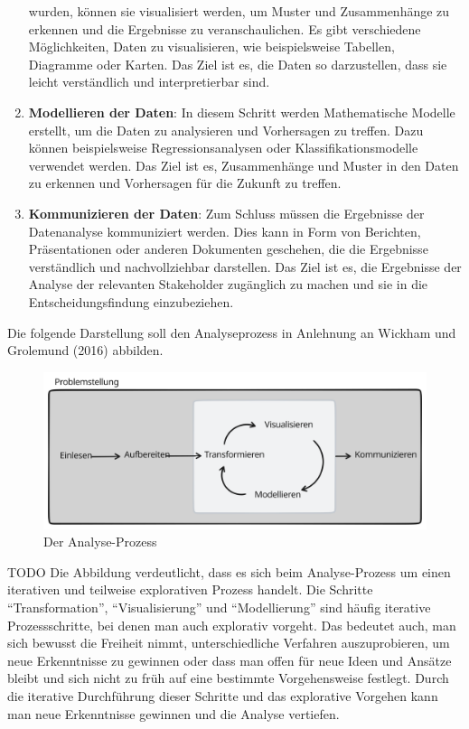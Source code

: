 \documentclass[
  letterpaper,
  DIV=11]{scrreprt}
\begin{document}
\begin{enumerate}
  wurden, können sie visualisiert werden, um Muster und Zusammenhänge zu
  erkennen und die Ergebnisse zu veranschaulichen. Es gibt verschiedene
  Möglichkeiten, Daten zu visualisieren, wie beispielsweise Tabellen,
  Diagramme oder Karten. Das Ziel ist es, die Daten so darzustellen,
  dass sie leicht verständlich und interpretierbar sind.
\item
  \textbf{Modellieren der Daten}: In diesem Schritt werden Mathematische
  Modelle erstellt, um die Daten zu analysieren und Vorhersagen zu
  treffen. Dazu können beispielsweise Regressionsanalysen oder
  Klassifikationsmodelle verwendet werden. Das Ziel ist es,
  Zusammenhänge und Muster in den Daten zu erkennen und Vorhersagen für
  die Zukunft zu treffen.
\item
  \textbf{Kommunizieren der Daten}: Zum Schluss müssen die Ergebnisse
  der Datenanalyse kommuniziert werden. Dies kann in Form von Berichten,
  Präsentationen oder anderen Dokumenten geschehen, die die Ergebnisse
  verständlich und nachvollziehbar darstellen. Das Ziel ist es, die
  Ergebnisse der Analyse der relevanten Stakeholder zugänglich zu machen
  und sie in die Entscheidungsfindung einzubeziehen.
\end{enumerate}

Die folgende Darstellung soll den Analyseprozess in Anlehnung an Wickham
und Grolemund (2016) abbilden.

\begin{figure}

{\centering \includegraphics{Chapters/01_Chapter/../../_assets/Analyse_Prozess.svg}

}

\caption{Der Analyse-Prozess}

\end{figure}

TODO Die Abbildung verdeutlicht, dass es sich beim Analyse-Prozess um
einen iterativen und teilweise explorativen Prozess handelt. Die
Schritte ``Transformation'', ``Visualisierung'' und ``Modellierung''
sind häufig iterative Prozessschritte, bei denen man auch explorativ
vorgeht. Das bedeutet auch, man sich bewusst die Freiheit nimmt,
unterschiedliche Verfahren auszuprobieren, um neue Erkenntnisse zu
gewinnen oder dass man offen für neue Ideen und Ansätze bleibt und sich
nicht zu früh auf eine bestimmte Vorgehensweise festlegt. Durch die
iterative Durchführung dieser Schritte und das explorative Vorgehen kann
man neue Erkenntnisse gewinnen und die Analyse vertiefen.
\end{document}
